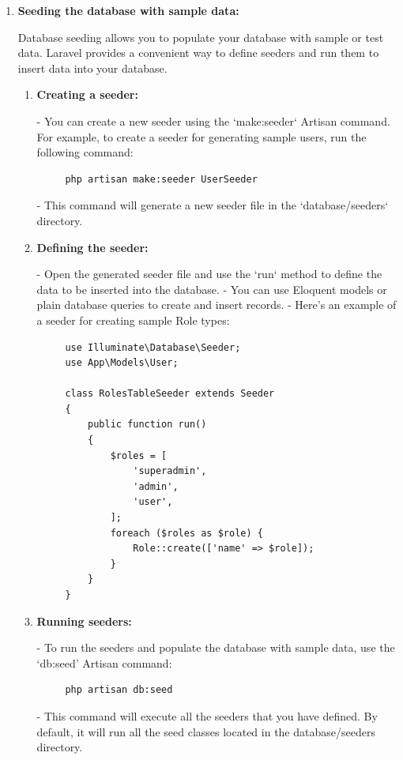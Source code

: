 \begin{enumerate}
\begin{enumerate}
- To run migrations and apply the changes to the database, use the `migrate` Artisan command:
   \begin{verbatim}
     php artisan migrate
    \end{verbatim}
   - This command will execute any pending migrations and update the database schema accordingly.
\end{enumerate}

\item \textbf{Seeding the database with sample data:}

\medskip Database seeding allows you to populate your database with sample or test data. Laravel provides a convenient way to define seeders and run them to insert data into your database.
\begin{enumerate}
    \item \textbf{Creating a seeder:}
   
    - You can create a new seeder using the `make:seeder` Artisan command. For example, to create a seeder for generating sample users, run the following command:
   \begin{verbatim}
     php artisan make:seeder UserSeeder
    \end{verbatim}
   - This command will generate a new seeder file in the `database/seeders` directory.

   \item \textbf{Defining the seeder:}
   
   - Open the generated seeder file and use the `run` method to define the data to be inserted into the database.
   - You can use Eloquent models or plain database queries to create and insert records.
   - Here's an example of a seeder for creating sample Role types:
\begin{verbatim}
     use Illuminate\Database\Seeder;
     use App\Models\User;

     class RolesTableSeeder extends Seeder
     {
         public function run()
         {
             $roles = [
                 'superadmin',
                 'admin',
                 'user',
             ];
             foreach ($roles as $role) {
                 Role::create(['name' => $role]);
             }
         }
     }
\end{verbatim}

\item \textbf{Running seeders:}
   
- To run the seeders and populate the database with sample data, use the `db:seed' Artisan command:
   \begin{verbatim}
     php artisan db:seed
    \end{verbatim}
   - This command will execute all the seeders that you have defined. By default, it will run all the seed classes located in the database/seeders directory.


\end{enumerate}
\end{enumerate}

